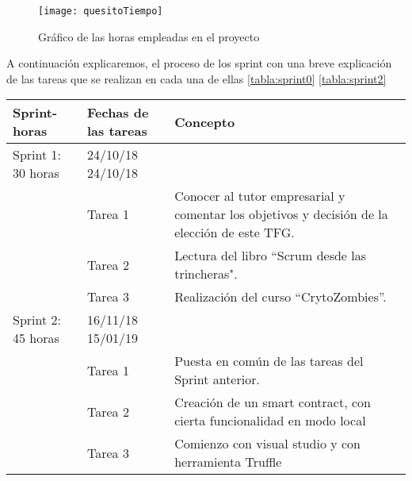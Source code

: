 \begin{figure}
    \centering
    \texttt{[image: quesitoTiempo]}
    \caption{Gráfico de las horas empleadas en el proyecto}
    \label{ref:horas}
\end{figure}
 
A continuación explicaremos, el proceso de los sprint con una breve explicación de las tareas que se realizan en cada una de ellas \ref{tabla:sprint0} \ref{tabla:sprint2} 

\begin{table}[H]
\begin{tabular}{|p{1.5cm}|p{1.5cm}|p{5cm}}
\hline
\textbf{Sprint- horas} &  \textbf{Fechas de las tareas} & \multicolumn{1}{l|}{\textbf{Concepto}}                                                                                    \\ \hline
Sprint 1: 30 horas       & 24/10/18 24/10/18           &                                                                                                                   \\ \hline
               & Tarea 1             & \multicolumn{1}{p{9.2cm}|}{Conocer al tutor empresarial y comentar los objetivos y decisión de la elección de este TFG.} \\ \hline
                         & Tarea 2                       & \multicolumn{1}{p{9.2cm}|}{Lectura del libro “Scrum desde las trincheras".}                                              \\ \hline
                         & Tarea 3                       & \multicolumn{1}{p{9.2cm}|}{Realización del curso “CrytoZombies”.}                                                        \\ \hline
Sprint 2: 45 horas       & 16/11/18 15/01/19           & \multicolumn{1}{p{9.2cm}|}{}                                                                                             \\ \hline
                         & Tarea 1                       & \multicolumn{1}{p{9.2cm}|}{Puesta en común de las tareas del Sprint anterior.}                                  \\ \hline
                         & Tarea 2                       & \multicolumn{1}{p{9.2cm}|}{Creación de un smart contract, con cierta funcionalidad en modo local}               \\ \hline
                         & Tarea 3                       & \multicolumn{1}{p{9.2cm}|}{Comienzo con visual studio y con herramienta Truffle}                                \\ \hline 


\end{tabular}
\end{table}
